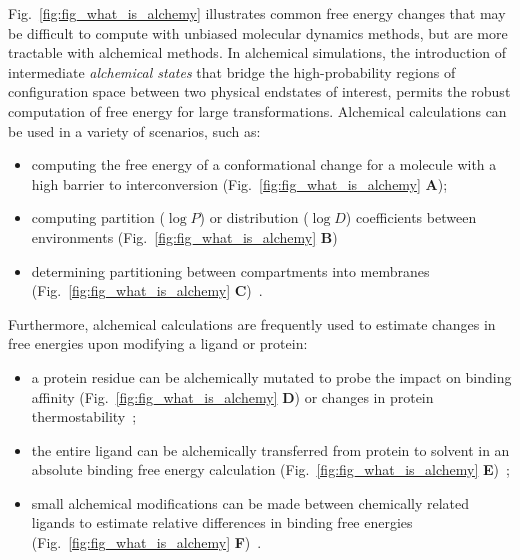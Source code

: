 \documentclass[9pt,bestpractices]{livecoms}
\begin{document}
Fig.~\ref{fig:fig_what_is_alchemy} illustrates common free energy changes that may be difficult to compute with unbiased molecular dynamics methods, but are more tractable with alchemical methods.
In alchemical simulations, the introduction of intermediate \textit{alchemical states} that bridge the high-probability regions of configuration space between two physical endstates of interest, permits the robust computation of free energy for large transformations.
Alchemical calculations can be used in a variety of scenarios, such as: 
\begin{itemize}
\item computing the free energy of a conformational change for a molecule with a high barrier to interconversion (Fig.~\ref{fig:fig_what_is_alchemy} \textbf{A});
\item computing partition ($\log P$) or distribution ($\log D$) coefficients between environments (Fig.~\ref{fig:fig_what_is_alchemy} \textbf{B})~\cite{rustenburg2016measuring, bosisio2016blinded} 
\item determining partitioning between compartments into membranes (Fig.~\ref{fig:fig_what_is_alchemy} \textbf{C})~\cite{corey2019insights}. 
\end{itemize}

Furthermore, alchemical calculations are frequently used to estimate changes in free energies upon modifying a ligand or protein: 
\begin{itemize}
\item a protein residue can be alchemically mutated to probe the impact on binding affinity (Fig.~\ref{fig:fig_what_is_alchemy} \textbf{D})\cite{hauser2018predicting,aldeghi2018accurate} or changes in protein thermostability~\cite{seeliger2010protein,gapsys2016insights,gapsys2016accurate,aldeghi2019accurate}; 
\item the entire ligand can be alchemically transferred from protein to solvent in an absolute binding free energy calculation (Fig.~\ref{fig:fig_what_is_alchemy} \textbf{E})~\cite{mobley2007predicting,aldeghi2015accurate,aldeghi2017predictions}; 
\item small alchemical modifications can be made between chemically related ligands to estimate relative differences in binding free energies (Fig.~\ref{fig:fig_what_is_alchemy} \textbf{F})~\cite{wang2015accurate,mey2016blinded,song2019using,gapsys2020large,kuhn2020assessment}.
\end{itemize}
\end{document}
